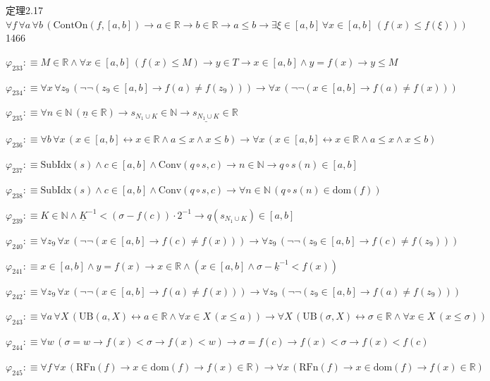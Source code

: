 \begin{fullproof}{定理2.17}{$\forall f\,\forall a\,\forall b\,(\mathrm{ContOn}(f,[a,b]) \to a \in \mathbb{R} \to b \in \mathbb{R} \to a \leq b \to \exists \xi \in [a,b]\,\forall x \in [a,b]\,(f(x) \leq f(\xi)))$}{1466}
\begin{abbrevlist}
\item $\varphi_{233} :\equiv M \in \mathbb{R} \land \forall x \in [a,b]\,(f(x) \leq M) \to y \in T \to x \in [a,b] \land y = f(x) \to y \leq M$
\item $\varphi_{234} :\equiv \forall x\,\forall z_{9}\,(\neg \neg (z_{9} \in [a,b] \to f(a) \neq f(z_{9}))) \to \forall x\,(\neg \neg (x \in [a,b] \to f(a) \neq f(x)))$
\item $\varphi_{235} :\equiv \forall n \in \mathbb{N}\,(\underline{n} \in \mathbb{R}) \to s_{N_{1} \cup K} \in \mathbb{N} \to \underline{s_{N_{1} \cup K}} \in \mathbb{R}$
\item $\varphi_{236} :\equiv \forall b\,\forall x\,(x \in [a,b] \leftrightarrow x \in \mathbb{R} \land a \leq x \land x \leq b) \to \forall x\,(x \in [a,b] \leftrightarrow x \in \mathbb{R} \land a \leq x \land x \leq b)$
\item $\varphi_{237} :\equiv \mathrm{SubIdx}(s) \land c \in [a,b] \land \mathrm{Conv}(q \circ s,c) \to n \in \mathbb{N} \to q \circ s(n) \in [a,b]$
\item $\varphi_{238} :\equiv \mathrm{SubIdx}(s) \land c \in [a,b] \land \mathrm{Conv}(q \circ s,c) \to \forall n \in \mathbb{N}\,(q \circ s(n) \in \mathrm{dom}(f))$
\item $\varphi_{239} :\equiv K \in \mathbb{N} \land \underline{K}^{-1} < (\sigma - f(c)) \cdot 2^{-1} \to q(s_{N_{1} \cup K}) \in [a,b]$
\item $\varphi_{240} :\equiv \forall z_{9}\,\forall x\,(\neg \neg (x \in [a,b] \to f(c) \neq f(x))) \to \forall z_{9}\,(\neg \neg (z_{9} \in [a,b] \to f(c) \neq f(z_{9})))$
\item $\varphi_{241} :\equiv x \in [a,b] \land y = f(x) \to x \in \mathbb{R} \land (x \in [a,b] \land \sigma - \underline{k}^{-1} < f(x))$
\item $\varphi_{242} :\equiv \forall z_{9}\,\forall x\,(\neg \neg (x \in [a,b] \to f(a) \neq f(x))) \to \forall z_{9}\,(\neg \neg (z_{9} \in [a,b] \to f(a) \neq f(z_{9})))$
\item $\varphi_{243} :\equiv \forall a\,\forall X\,(\mathrm{UB}(a,X) \leftrightarrow a \in \mathbb{R} \land \forall x \in X\,(x \leq a)) \to \forall X\,(\mathrm{UB}(\sigma,X) \leftrightarrow \sigma \in \mathbb{R} \land \forall x \in X\,(x \leq \sigma))$
\item $\varphi_{244} :\equiv \forall w\,(\sigma = w \to f(x) < \sigma \to f(x) < w) \to \sigma = f(c) \to f(x) < \sigma \to f(x) < f(c)$
\item $\varphi_{245} :\equiv \forall f\,\forall x\,(\mathrm{RFn}(f) \to x \in \mathrm{dom}(f) \to f(x) \in \mathbb{R}) \to \forall x\,(\mathrm{RFn}(f) \to x \in \mathrm{dom}(f) \to f(x) \in \mathbb{R})$

\end{abbrevlist}
\end{fullproof}
